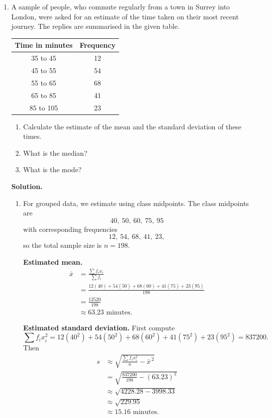 \documentclass[12pt]{scrartcl}
\begin{document}
\begin{enumerate}[label=\textbf{\arabic*.}]
\newpage
\item A sample of people, who commute regularly from a town in Surrey into London, were asked for an estimate of the time
taken on their most recent journey. The replies are summarised in the given table.

\medskip

\begin{center}
\setlength{\tabcolsep}{10pt}
\renewcommand{\arraystretch}{1.2}
\begin{tabular}{c|c}
\textbf{Time in minutes} & \textbf{Frequency}\\
\hline
35 to 45  & 12\\
45 to 55  & 54\\
55 to 65  & 68\\
65 to 85  & 41\\
85 to 105 & 23\\
\end{tabular}
\end{center}

\begin{enumerate}[label=(\alph*)]
\item Calculate the estimate of the mean and the standard deviation of these times.
\item What is the median?
\item What is the mode?
\end{enumerate}

\medskip

\textbf{Solution.}

\begin{enumerate}[label=(\alph*)]
\item For grouped data, we estimate using class midpoints. The class midpoints are
\[
40,\ 50,\ 60,\ 75,\ 95
\]
with corresponding frequencies
\[
12,\ 54,\ 68,\ 41,\ 23,
\]
so the total sample size is $n=198$.

\medskip

\textbf{Estimated mean.}
\begin{align*}
\bar{x}
&=\frac{\sum f_i x_i}{\sum f_i}\\
&=\frac{12(40)+54(50)+68(60)+41(75)+23(95)}{198}\\
&=\frac{12520}{198}\\
&\approx 63.23\text{ minutes.}
\end{align*}

\medskip

\textbf{Estimated standard deviation.}
First compute
\[
\sum f_i x_i^2
=12(40^2)+54(50^2)+68(60^2)+41(75^2)+23(95^2)
=837200.
\]
Then
\begin{align*}
s
&\approx \sqrt{\frac{\sum f_i x_i^2}{n}-\bar{x}^{\,2}}\\
&=\sqrt{\frac{837200}{198}-(63.23)^2}\\
&\approx \sqrt{4228.28-3998.33}\\
&\approx \sqrt{229.95}\\
&\approx 15.16\text{ minutes.}
\end{align*}


\end{enumerate}
\end{enumerate}
\end{document}
